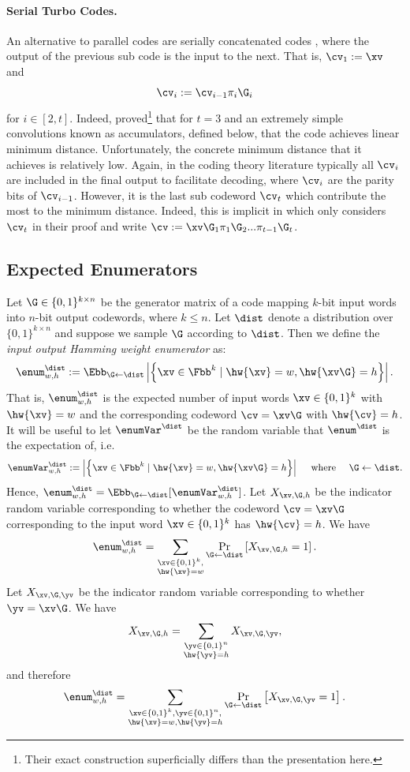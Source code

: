\paragraph{Serial Turbo Codes.} An alternative to parallel codes are serially concatenated codes \cite{kahale1998minimum,benedetto1998serial}, where the output of the previous sub code is the input to the next. That is,  $\cv_1:=\xv$ and
$$
\cv_i := \cv_{i-1} \pi_i \G_i
$$
for $i\in [2,t]$. Indeed, \cite{kahale1998minimum,spielman} proved\footnote{Their exact construction superficially differs than the presentation here.} that for $t=3$ and an extremely simple convolutions known as accumulators, defined below, that the code achieves linear minimum distance. Unfortunately, the concrete minimum distance that it achieves is relatively low. Again, in the coding theory literature typically all $\cv_i$ are included in the final output to facilitate decoding, where $\cv_i$ are the parity bits of $\cv_{i-1}$. However, it is the last sub codeword $\cv_t$ which contribute the most to the minimum distance. Indeed, this is implicit in \cite{spielman} which only considers $\cv_t$ in their proof and write $\cv := \xv \G_1 \pi_1 \G_2 ... \pi_{t-1} \G_t$.

\subsection{Expected Enumerators}\label{eenum}

Let $\G \in \{0,1\}^{k \times n}$ be the generator matrix of a code mapping $k$-bit input words into $n$-bit output codewords, where $k \le n$. Let $\dist$ denote a distribution over $\{0,1\}^{k \times n}$ and suppose we sample $\G$ according to $\dist$. Then we define the \emph{input output Hamming weight enumerator}  as:
$$
\enum^{\dist}_{w,h}:= \Ebb_{\G\gets\dist} \left|\left\{ \xv \in \Fbb^{k} \mid \hw{\xv}=w,\hw{\xv\G}=h \right\} \right|.
$$
That is, $\enum^{\dist}_{w,h}$ is the expected number of input words $\xv \in \{0,1\}^k$ with $\hw{\xv} = w$ and the corresponding codeword $\cv = \xv\G$ with $\hw{\cv} = h$. It will be useful to let $\enumVar^\dist$ be the random variable that $\enum^{\dist}$ is the expectation  of, i.e.
$$
\enumVar^{\dist}_{w,h}:= \left|\left\{ \xv \in \Fbb^{k} \mid \hw{\xv}=w,\hw{\xv\G}=h \right\} \right| \quad\text{ where } \quad  \G\gets\dist.
$$
Hence, $\enum^\dist_{w,h}=\Ebb_{\G\gets\dist}[\enumVar^\dist_{w,h}]$.
Let $X_{\xv, \G, h}$ be the indicator random variable corresponding to whether the codeword $\cv = \xv\G$ corresponding to the input word $\xv \in \{0,1\}^k$ has $\hw{\cv} = h$. We have
$$
\enum^\dist_{w,h}=\sum_{\substack{\xv \in \{0,1\}^k,\\\hw{\xv} = w}}\Pr_{\G \gets \dist}\left[X_{\xv, \G, h}=1\right].
$$
Let $X_{\xv, \G, \yv}$ be the indicator random variable corresponding to whether $\yv = \xv\G$. We have
$$
X_{\xv, \G, h} = \sum_{\substack{\yv \in \{0,1\}^n\\\hw{\yv} = h}}X_{\xv, \G, \yv},
$$
and therefore
$$
\enum^\dist_{w,h}=\sum_{\substack{\xv\in \{0,1\}^k, \yv \in \{0,1\}^n,\\\hw{\xv} = w,\hw{\yv} = h}}\Pr_{\G \gets \dist}\left[X_{\xv, \G, \yv}=1\right].
$$

